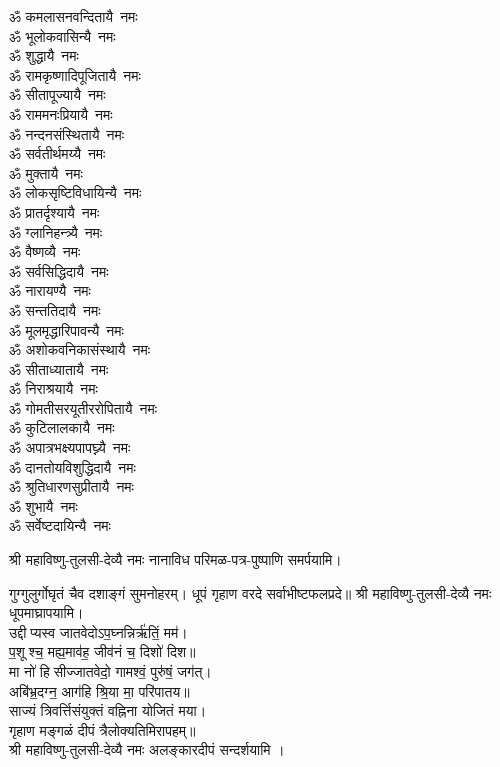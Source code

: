\begin{multicols}{2}
\begin{flushleft}
ॐ कमलासनवन्दितायै~नमः\\
ॐ भूलोकवासिन्यै~नमः\\
ॐ शुद्धायै~नमः\\
ॐ रामकृष्णादिपूजितायै~नमः\\
ॐ सीतापूज्यायै~नमः\\
ॐ राममनःप्रियायै~नमः\\
ॐ नन्दनसंस्थितायै~नमः\\
ॐ सर्वतीर्थमय्यै~नमः\\
ॐ मुक्तायै~नमः\hfill{}‌\\
ॐ लोकसृष्टिविधायिन्यै~नमः\\
ॐ प्रातर्दृश्यायै~नमः\\
ॐ ग्लानिहन्त्र्यै~नमः\\
ॐ वैष्णव्यै~नमः\\
ॐ सर्वसिद्धिदायै~नमः\\
ॐ नारायण्यै~नमः\\
ॐ सन्ततिदायै~नमः\\
ॐ मूलमृद्धारिपावन्यै~नमः\\
ॐ अशोकवनिकासंस्थायै~नमः\\
ॐ सीताध्यातायै~नमः\hfill{}‌\\
ॐ निराश्रयायै~नमः\\
ॐ गोमतीसरयूतीररोपितायै~नमः\\
ॐ कुटिलालकायै~नमः\\
ॐ अपात्रभक्ष्यपापघ्न्यै~नमः\\
ॐ दानतोयविशुद्धिदायै~नमः\\
ॐ श्रुतिधारणसुप्रीतायै~नमः\\
ॐ शुभायै~नमः\\
ॐ सर्वेष्टदायिन्यै~नमः\hfill{}\\
\end{flushleft}
\end{multicols}
श्री महाविष्णु-तुलसी-देव्यै नमः नानाविध परिमळ-पत्र-पुष्पाणि समर्पयामि।


गुग्गुलुर्गोघृतं चैव दशाङ्गं सुमनोहरम्।
धूपं गृहाण वरदे सर्वाभीष्टफलप्रदे॥
श्री महाविष्णु-तुलसी-देव्यै नमः धूपमाघ्रापयामि।\\

उद्दीप्यस्व जातवेदोऽप॒घ्नन्निर्ऋ॑तिं॒ मम॑।\\
 प॒शूश्च॒ मह्य॒माव॑ह॒ जीव॑नं च॒ दिशो॑ दिश॥ \\
मा नो॑ हिसीज्जातवेदो॒ गामश्वं॒ पुरु॑षं॒ जग॑त्।\\
अबि॑भ्र॒दग्न॒ आग॑हि श्रि॒या मा॒ परि॑पातय॥ \\
साज्यं त्रिवर्त्तिसंयुक्तं वह्निना योजितं मया।\\
गृहाण मङ्गळं दीपं त्रैलोक्यतिमिरापहम्॥ \\
श्री महाविष्णु-तुलसी-देव्यै नमः अलङ्कारदीपं सन्दर्शयामि ।\\

